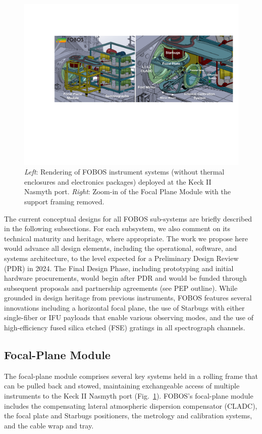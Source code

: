 \documentclass[oneside,11pt]{amsart}
\begin{document}
\begin{figure}[h!]
\vskip -0.1in
\includegraphics[width=\textwidth]{figs/FOBOS_inst_FPzoom_v2.pdf}
\caption{\small {\it Left}: Rendering of FOBOS instrument systems (without thermal enclosures and electronics packages) deployed at the Keck II Nasmyth port. {\it Right}: Zoom-in of the Focal Plane Module with the support framing removed.}
\label{fig:layout}
\end{figure}

\noindent The current conceptual designs for all FOBOS sub-systems are briefly described in the following subsections. %
For each subsystem, we also comment on its technical maturity and heritage, where appropriate.  The work we propose here would advance all design elements, including the operational, software, and systems architecture, to the level expected for a Preliminary Design Review (PDR) in 2024.  The Final Design Phase, including prototyping and initial hardware procurements, would begin after PDR and would be funded through subsequent proposals and partnership agreements (see PEP outline). %
While grounded in design heritage from previous instruments, FOBOS features several innovations including a horizontal focal plane, the use of Starbugs with either single-fiber or IFU payloads that enable various observing modes, and the use of high-efficiency fused silica etched (FSE) gratings in all spectrograph channels.

\subsection{Focal-Plane Module} The focal-plane module comprises several key systems held in a rolling frame that can be pulled back and stowed, maintaining exchangeable access of multiple instruments to the Keck II Nasmyth port (Fig.~\ref{fig:layout}).  FOBOS's focal-plane module includes the compensating lateral atmospheric dispersion compensator (CLADC), the focal plate and Starbugs positioners, the metrology and calibration systems, and the cable wrap and tray.
\end{document}
